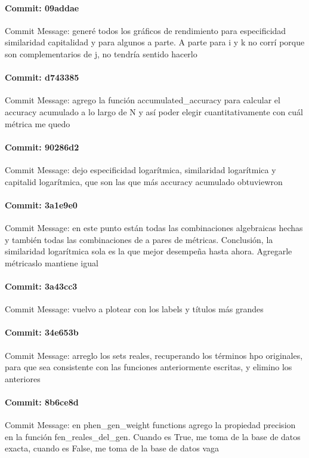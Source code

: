 \documentclass{article}
\begin{document}
\paragraph{Commit: 09addae}
Commit Message: generé todos los gráficos de rendimiento para especificidad similaridad capitalidad y para algunos a parte. A parte para i y k no corrí porque son complementarios de j, no tendría sentido hacerlo

\paragraph{Commit: d743385}
Commit Message: agrego la función accumulated_accuracy para calcular el accuracy acumulado a lo largo de N y así poder elegir cuantitativamente con cuál métrica me quedo

\paragraph{Commit: 90286d2}
Commit Message: dejo especificidad logarítmica, similaridad logarítmica y capitalid logarítmica, que son las que más accuracy acumulado obtuviewron

\paragraph{Commit: 3a1e9e0}
Commit Message: en este punto están todas las combinaciones algebraicas hechas y también todas las combinaciones de a pares de métricas. Conclusión, la similaridad logarítmica sola es la que mejor desempeña hasta ahora. Agregarle métricaslo mantiene igual

\paragraph{Commit: 3a43cc3}
Commit Message: vuelvo a plotear con los labels y títulos más grandes

\paragraph{Commit: 34e653b}
Commit Message: arreglo los sets reales, recuperando los términos hpo originales, para que sea consistente con las funciones anteriormente escritas, y elimino los anteriores

\paragraph{Commit: 8b6ce8d}
Commit Message: en phen_gen_weight functions agrego la propiedad precision en la función fen_reales_del_gen. Cuando es True, me toma de la base de datos exacta, cuando es False, me toma de la base de datos vaga
\end{document}
